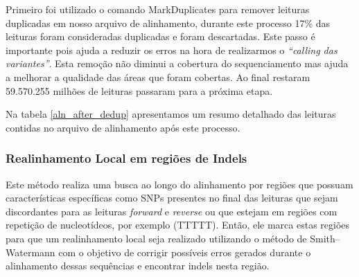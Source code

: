 Primeiro foi utilizado o comando MarkDuplicates para remover leituras duplicadas em nosso arquivo de alinhamento, durante este processo 17\% das leituras foram consideradas duplicadas e foram descartadas. Este passo é importante pois ajuda a reduzir os erros na hora de realizarmos o \textit{``calling das variantes''}. Esta remoção não diminui a cobertura do sequenciamento mas ajuda a melhorar a qualidade das áreas que foram cobertas. Ao final restaram 59.570.255 milhões de leituras passaram para a próxima etapa.

Na tabela \ref{aln_after_dedup} apresentamos um resumo detalhado das leituras contidas no arquivo de alinhamento após este processo.


\subsubsection{Realinhamento Local em regiões de Indels}


Este método realiza uma busca ao longo do alinhamento por regiões que possuam características específicas como SNPs presentes no final das leituras que sejam discordantes para as leituras \textit{forward} e \textit{reverse} ou que estejam em regiões com repetição de nucleotídeos, por exemplo (TTTTT). Então, ele marca estas regiões para que um realinhamento local seja realizado utilizando o método de Smith–Watermann com o objetivo de corrigir possíveis erros gerados durante o alinhamento dessas sequências e encontrar indels nesta região.

